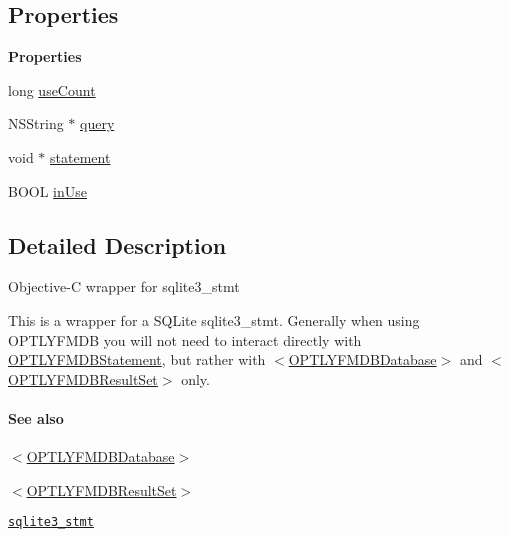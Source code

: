 \subsection*{Properties}
\begin{Indent}\textbf{ Properties}\par
{\em 

 

 }\begin{DoxyCompactItemize}
\item 
long \mbox{\hyperlink{interface_o_p_t_l_y_f_m_d_b_statement_af1794014297f7736c19ec236ff9782dd}{use\+Count}}
\item 
N\+S\+String $\ast$ \mbox{\hyperlink{interface_o_p_t_l_y_f_m_d_b_statement_a9afb5dd315ed4995b9def5d96b8ed0b8}{query}}
\item 
void $\ast$ \mbox{\hyperlink{interface_o_p_t_l_y_f_m_d_b_statement_a83c6eecfa4b68376594f3fc83f540849}{statement}}
\item 
B\+O\+OL \mbox{\hyperlink{interface_o_p_t_l_y_f_m_d_b_statement_a891190e3df41ab56f047b172e19ef871}{in\+Use}}
\end{DoxyCompactItemize}
\end{Indent}


\subsection{Detailed Description}
Objective-\/C wrapper for {\ttfamily sqlite3\+\_\+stmt}

This is a wrapper for a S\+Q\+Lite {\ttfamily sqlite3\+\_\+stmt}. Generally when using O\+P\+T\+L\+Y\+F\+M\+DB you will not need to interact directly with {\ttfamily \mbox{\hyperlink{interface_o_p_t_l_y_f_m_d_b_statement}{O\+P\+T\+L\+Y\+F\+M\+D\+B\+Statement}}}, but rather with {\ttfamily $<$\mbox{\hyperlink{interface_o_p_t_l_y_f_m_d_b_database}{O\+P\+T\+L\+Y\+F\+M\+D\+B\+Database}}$>$} and {\ttfamily $<$\mbox{\hyperlink{interface_o_p_t_l_y_f_m_d_b_result_set}{O\+P\+T\+L\+Y\+F\+M\+D\+B\+Result\+Set}}$>$} only.

\paragraph*{See also}


\begin{DoxyItemize}
\item {\ttfamily $<$\mbox{\hyperlink{interface_o_p_t_l_y_f_m_d_b_database}{O\+P\+T\+L\+Y\+F\+M\+D\+B\+Database}}$>$}
\item {\ttfamily $<$\mbox{\hyperlink{interface_o_p_t_l_y_f_m_d_b_result_set}{O\+P\+T\+L\+Y\+F\+M\+D\+B\+Result\+Set}}$>$}
\item \href{http://www.sqlite.org/c3ref/stmt.html}{\tt {\ttfamily sqlite3\+\_\+stmt}} 
\end{DoxyItemize}

